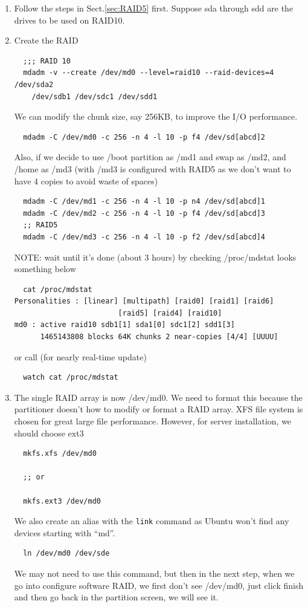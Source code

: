 \begin{enumerate}
  \item Follow the steps in Sect.\ref{sec:RAID5} first. Suppose sda through sdd
  are the drives to be used on RAID10. 

\item Create the RAID  
  \begin{verbatim}
  ;;; RAID 10
  mdadm -v --create /dev/md0 --level=raid10 --raid-devices=4 /dev/sda2 
    /dev/sdb1 /dev/sdc1 /dev/sdd1
  \end{verbatim}
  We can modify the chunk size, say 256KB, to improve the I/O performance. 
  \begin{verbatim}
  mdadm -C /dev/md0 -c 256 -n 4 -l 10 -p f4 /dev/sd[abcd]2 
  \end{verbatim}
  Also, if we decide to use /boot partition as /md1 and swap as /md2, and
  /home as /md3 (with /md3 is configured with RAID5 as we don't want to have 4
  copies to avoid waste of spaces)
  \begin{verbatim}
  mdadm -C /dev/md1 -c 256 -n 4 -l 10 -p n4 /dev/sd[abcd]1
  mdadm -C /dev/md2 -c 256 -n 4 -l 10 -p f4 /dev/sd[abcd]3
  ;; RAID5
  mdadm -C /dev/md3 -c 256 -n 4 -l 10 -p f2 /dev/sd[abcd]4
  \end{verbatim}
  
  NOTE: wait until it's done (about 3 hours) by checking /proc/mdstat looks
  something below
  \begin{verbatim}
  cat /proc/mdstat
Personalities : [linear] [multipath] [raid0] [raid1] [raid6]
                        [raid5] [raid4] [raid10]
md0 : active raid10 sdb1[1] sda1[0] sdc1[2] sdd1[3]
      1465143808 blocks 64K chunks 2 near-copies [4/4] [UUUU]
  \end{verbatim}
  or call (for nearly real-time update)
  \begin{verbatim}
  watch cat /proc/mdstat
  \end{verbatim}
  
  \item The single RAID array is now /dev/md0. We need to format this because
  the partitioner doesn't how to modify or format a RAID array. XFS file system
  is chosen for great large file performance. However, for server installation,
  we should choose ext3
  \begin{verbatim}
  mkfs.xfs /dev/md0
  
  ;; or
  
  mkfs.ext3 /dev/md0  
  \end{verbatim}  
  We also create an alias with the \verb!link! command as Ubuntu won't find any
  devices starting with ``md''.   
  \begin{verbatim}
  ln /dev/md0 /dev/sde
  \end{verbatim}
  We may not need to use this command, but then in the next step, when we go
  into configure software RAID, we first don't see /dev/md0, just click finish
  and then go back in the partition screen, we will see it.
  

\end{enumerate}
